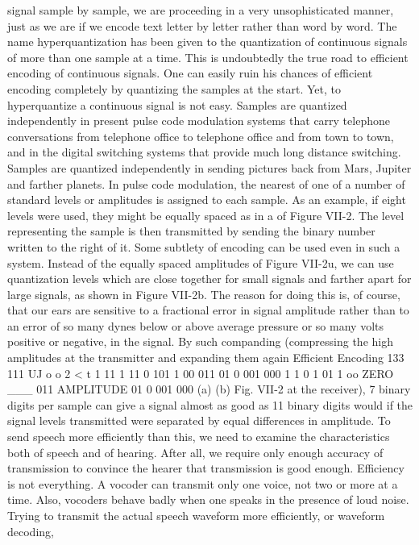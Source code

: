 {{{signal sample by sample, we are proceeding in a very unsophisticated
manner, just as we are if we encode text letter by letter rather
than word by word.
The name hyperquantization has been given to the quantization
of continuous signals of more than one sample at a time. This is
undoubtedly the true road to efficient encoding of continuous
signals. One can easily ruin his chances of efficient encoding completely
by quantizing the samples at the start. Yet, to hyperquantize
a continuous signal is not easy. Samples are quantized independently
in present pulse code modulation systems that carry telephone
conversations from telephone office to telephone office and from
town to town, and in the digital switching systems that provide
much long distance switching. Samples are quantized independently
in sending pictures back from Mars, Jupiter and farther
planets.
In pulse code modulation, the nearest of one of a number of
standard levels or amplitudes is assigned to each sample. As an
example, if eight levels were used, they might be equally spaced
as in a of Figure VII-2. The level representing the sample is then
transmitted by sending the binary number written to the right of it.
Some subtlety of encoding can be used even in such a system.
Instead of the equally spaced amplitudes of Figure VII-2u, we can
use quantization levels which are close together for small signals
and farther apart for large signals, as shown in Figure VII-2b. The
reason for doing this is, of course, that our ears are sensitive to a
fractional error in signal amplitude rather than to an error of so
many dynes below or above average pressure or so many volts
positive or negative, in the signal. By such companding (compressing
the high amplitudes at the transmitter and expanding them again
Efficient Encoding 133
111
UJ
o
o
2
<
t
1
11 1
11 0
101
1 00
011
01 0
001
000
1 1 0
1 01
1 oo
ZERO
___
011 AMPLITUDE
01 0
001
000
(a) (b)
Fig. VII-2
at the receiver), 7 binary digits per sample can give a signal almost
as good as 11 binary digits would if the signal levels transmitted
were separated by equal differences in amplitude.
To send speech more efficiently than this, we need to examine
the characteristics both of speech and of hearing. After all, we
require only enough accuracy of transmission to convince the
hearer that transmission is good enough.
Efficiency is not everything. A vocoder can transmit only one
voice, not two or more at a time. Also, vocoders behave badly
when one speaks in the presence of loud noise. Trying to transmit
the actual speech waveform more efficiently, or waveform decoding,
}}}

